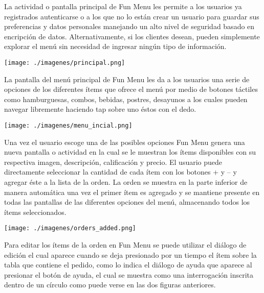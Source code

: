 \documentclass[letterpaper,12pt]{book}
\begin{document}
\begin{mainmatter}
La  actividad o  pantalla  principal de  Fun  Menu les  permite a  los
usuarios ya registrados autenticarse o a  los que no lo están crear un
usuario para guardar sus  preferencias y datos personales manejando un
alto    nivel     de    seguridad    basado     en    encripción    de
datos.  Alternativamente, si los  clientes desean,  pueden simplemente
explorar el menú sin necesidad de ingresar ningún tipo de información. 



\begin{center}
 \texttt{[image: ./imagenes/principal.png]}

\end{center}

La pantalla del  menú principal de Fun Menu les da  a los usuarios una
serie de opciones de los diferentes ítems que ofrece el menú por medio
de  botones  táctiles  como  hamburguesas, combos,  bebidas,  postres,
desayunos a  los cuales pueden  navegar libremente haciendo  tap sobre
uno éstos con el dedo.

\begin{center}
 \texttt{[image: ./imagenes/menu\_incial.png]}

\end{center}

Una vez el usuario escoge una de las posibles opciones Fun Menu genera
una nueva  pantalla o actividad  en la cual  se le muestran  los ítems
disponibles  con  su respectiva  imagen,  descripción, calificación  y
precio. El usuario puede  directamente seleccionar la cantidad de cada
ítem con los  botones + y – y  agregar éste a la lista de  la orden.
 La orden se muestra  en la parte inferior de manera  automática una vez el
primer ítem es agregado y  se mantiene presente en todas las pantallas
de  las diferentes  opciones  del menú,  almacenando  todos los  ítems
seleccionados.

\begin{center}
 \texttt{[image: ./imagenes/orders\_added.png]}

\end{center}

Para editar  los ítems de  la orden en  Fun Menu se puede  utilizar el
diálogo de  edición el cual aparece  cuando se deja  presionado por un
tiempo el ítem sobre la tabla que contiene el pedido, como lo indica el
diálogo de ayuda que aparece al presionar el botón de ayuda, el cual se muestra
como una interrogación inscrita dentro de un círculo como puede verse en
las dos figuras anteriores.


\end{mainmatter}
\end{document}
